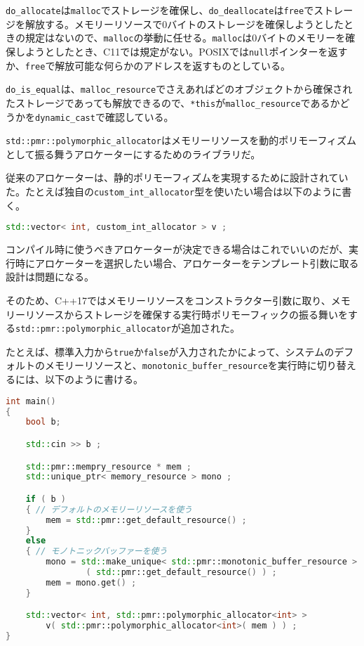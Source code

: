 \lstinline!do_allocate!は\lstinline!malloc!でストレージを確保し、\lstinline!do_deallocate!は\lstinline!free!でストレージを解放する。メモリーリソースで0バイトのストレージを確保しようとしたときの規定はないので、\lstinline!malloc!の挙動に任せる。\lstinline!malloc!は0バイトのメモリーを確保しようとしたとき、C11では規定がない。POSIXでは\lstinline!null!ポインターを返すか、\lstinline!free!で解放可能な何らかのアドレスを返すものとしている。

\lstinline!do_is_equal!は、\lstinline!malloc_resource!でさえあればどのオブジェクトから確保されたストレージであっても解放できるので、\lstinline!*this!が\lstinline!malloc_resource!であるかどうかを\lstinline!dynamic_cast!で確認している。

%

\lstinline!std::pmr::polymorphic_allocator!はメモリーリソースを動的ポリモーフィズムとして振る舞うアロケーターにするためのライブラリだ。

従来のアロケーターは、静的ポリモーフィズムを実現するために設計されていた。たとえば独自の\lstinline!custom_int_allocator!型を使いたい場合は以下のように書く。

\begin{lstlisting}[language=C++]
std::vector< int, custom_int_allocator > v ;
\end{lstlisting}

コンパイル時に使うべきアロケーターが決定できる場合はこれでいいのだが、実行時にアロケーターを選択したい場合、アロケーターをテンプレート引数に取る設計は問題になる。

そのため、C++17ではメモリーリソースをコンストラクター引数に取り、メモリーリソースからストレージを確保する実行時ポリモーフィックの振る舞いをする\lstinline!std::pmr::polymorphic_allocator!が追加された。

たとえば、標準入力から\lstinline!true!か\lstinline!false!が入力されたかによって、システムのデフォルトのメモリーリソースと、\lstinline!monotonic_buffer_resource!を実行時に切り替えるには、以下のように書ける。

\begin{lstlisting}[language=C++]
int main()
{
    bool b;

    std::cin >> b ;

    std::pmr::mempry_resource * mem ;
    std::unique_ptr< memory_resource > mono ;

    if ( b )
    { // デフォルトのメモリーリソースを使う
        mem = std::pmr::get_default_resource() ;
    }
    else
    { // モノトニックバッファーを使う
        mono = std::make_unique< std::pmr::monotonic_buffer_resource >
                ( std::pmr::get_default_resource() ) ;
        mem = mono.get() ;
    }

    std::vector< int, std::pmr::polymorphic_allocator<int> >
        v( std::pmr::polymorphic_allocator<int>( mem ) ) ;
}
\end{lstlisting}

